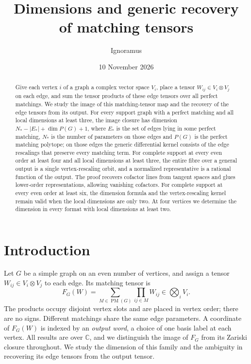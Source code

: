 \documentclass[11pt]{article}
\title{Dimensions and generic recovery\protect\\of matching tensors}
\author{Ignoramus}
\date{10 November 2026}
\theoremstyle{remark}\newtheorem{remark}[theorem]{Remark}
\newcommand{\C}{\mathbb C}
\newcommand{\PM}{\operatorname{PM}}
\begin{document}
\maketitle
\begin{abstract}
Give each vertex $i$ of a graph a complex vector space $V_i$, place a tensor $W_{ij}\in V_i\otimes V_j$ on each edge, and sum the tensor products of these edge tensors over all perfect matchings. We study the image of this matching-tensor map and the recovery of the edge tensors from its output. For every support graph with a perfect matching and all local dimensions at least three, the image closure has dimension $N_*-|E_*|+\dim P(G)+1$, where $E_*$ is the set of edges lying in some perfect matching, $N_*$ is the number of parameters on those edges and $P(G)$ is the perfect matching polytope; on those edges the generic differential kernel consists of the edge rescalings that preserve every matching term. For complete support at every even order at least four and all local dimensions at least three, the entire fibre over a general output is a single vertex-rescaling orbit, and a normalized representative is a rational function of the output. The proof recovers cofactor lines from tangent spaces and glues lower-order representations, allowing vanishing cofactors. For complete support at every even order at least six, the dimension formula and the vertex-rescaling kernel remain valid when the local dimensions are only two. At four vertices we determine the dimension in every format with local dimensions at least two.
\end{abstract}

\section{Introduction}
Let $G$ be a simple graph on an even number of vertices, and assign a tensor $W_{ij}\in V_i\otimes V_j$ to each edge. Its matching tensor is
\[
 F_G(W)=\sum_{M\in\PM(G)}\prod_{ij\in M}W_{ij}\in\bigotimes_i V_i.
\]
The products occupy disjoint vertex slots and are placed in vertex order; there are no signs. Different matchings share the same edge parameters. A coordinate of $F_G(W)$ is indexed by an \emph{output word}, a choice of one basis label at each vertex. All results are over $\C$, and we distinguish the image of $F_G$ from its Zariski closure throughout. We study the dimension of this family and the ambiguity in recovering its edge tensors from the output tensor.
\end{document}
